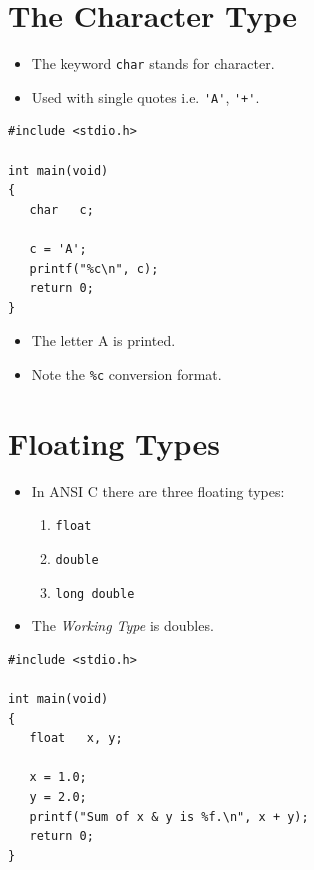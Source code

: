 \documentclass[a4,portraitt]{slides}
\begin{document}
\newpage
\section*{ The Character Type }

\begin{itemize}
\item The  keyword \verb+char+ stands for character.

\item Used with single quotes i.e.
\verb^'A'^,
\verb^'+'^.

\end{itemize}

\begin{verbatim}
#include <stdio.h>

int main(void)
{
   char   c;

   c = 'A';
   printf("%c\n", c);
   return 0;
}
\end{verbatim}

\begin{itemize}
\item The letter A is printed.
\item Note the \verb+%c+ conversion format.
\end{itemize}

\newpage
\section*{ Floating Types }


\begin{itemize}
\item In ANSI C there are three floating types:
    \begin{enumerate}
        \item \verb+float+
        \item \verb+double+
        \item \verb+long double+
    \end{enumerate}
\item The {\it Working Type} is doubles.
\end{itemize}

\begin{small}
\begin{verbatim}
#include <stdio.h>

int main(void)
{
   float   x, y;

   x = 1.0;
   y = 2.0;
   printf("Sum of x & y is %f.\n", x + y);
   return 0;
}
\end{verbatim}
\end{small}
\end{document}
